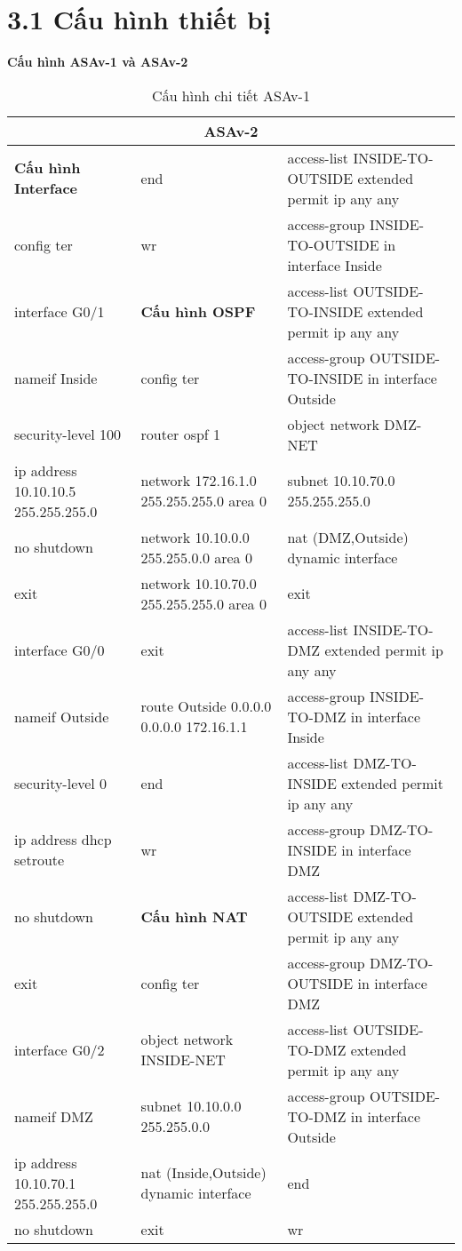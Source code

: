 \section*{3.1 Cấu hình thiết bị}
\textbf{Cấu hình ASAv-1 và ASAv-2}

\begin{table}[H]
\centering
\begin{tabular}{|p{3.5cm}|p{3.5cm}|p{9.5cm}|}
\hline
\multicolumn{3}{|c|}{ASAv-2} \\
\hline
\textbf{Cấu hình Interface} & end & access-list INSIDE-TO-OUTSIDE extended permit ip any any \\
config ter	&wr&	access-group INSIDE-TO-OUTSIDE in interface Inside \\

interface G0/1	&\textbf{Cấu hình OSPF}&	access-list OUTSIDE-TO-INSIDE extended permit ip any any\\
nameif Inside	&config ter&	access-group OUTSIDE-TO-INSIDE in interface Outside\\
security-level 100	&router ospf 1&	object network DMZ-NET\\
ip address 10.10.10.5 255.255.255.0	&network 172.16.1.0 255.255.255.0 area 0&	subnet 10.10.70.0 255.255.255.0\\
no shutdown	&network 10.10.0.0 255.255.0.0 area 0	&nat (DMZ,Outside) dynamic interface \\
exit	&network 10.10.70.0 255.255.255.0 area 0&	exit \\

interface G0/0	&exit&	access-list INSIDE-TO-DMZ extended permit ip any any\\
nameif Outside	& route Outside 0.0.0.0 0.0.0.0 172.16.1.1 &	access-group INSIDE-TO-DMZ in interface Inside\\
security-level 0	&end&	access-list DMZ-TO-INSIDE extended permit ip any any\\
ip address dhcp setroute	&wr&	access-group DMZ-TO-INSIDE in interface DMZ\\
no shutdown	&\textbf{Cấu hình NAT}&	access-list DMZ-TO-OUTSIDE extended permit ip any any\\
exit	&config ter&	access-group DMZ-TO-OUTSIDE in interface DMZ\\
interface G0/2	&object network INSIDE-NET&	access-list OUTSIDE-TO-DMZ extended permit ip any any\\
nameif DMZ	&subnet 10.10.0.0 255.255.0.0&	access-group OUTSIDE-TO-DMZ in interface Outside\\
ip address 10.10.70.1 255.255.255.0	&nat (Inside,Outside) dynamic interface&	end\\
no shutdown	&exit&	wr\\
\hline
\end{tabular}
\caption{Cấu hình chi tiết ASAv-1}
\end{table}

